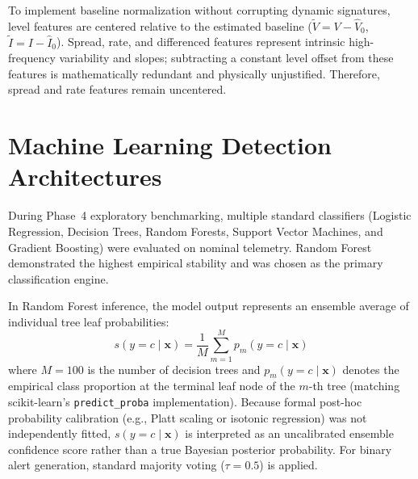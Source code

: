 \documentclass[conference]{IEEEtran}
\begin{document}
To implement baseline normalization without corrupting dynamic signatures, level features are centered relative to the estimated baseline ($\tilde{V} = V - \hat{V}_0$, $\tilde{I} = I - \hat{I}_0$). Spread, rate, and differenced features represent intrinsic high-frequency variability and slopes; subtracting a constant level offset from these features is mathematically redundant and physically unjustified. Therefore, spread and rate features remain uncentered.

\section{Machine Learning Detection Architectures}
During Phase~4 exploratory benchmarking, multiple standard classifiers (Logistic Regression, Decision Trees, Random Forests, Support Vector Machines, and Gradient Boosting) were evaluated on nominal telemetry. Random Forest demonstrated the highest empirical stability and was chosen as the primary classification engine.

In Random Forest inference, the model output represents an ensemble average of individual tree leaf probabilities:
\begin{equation}
s(y=c \mid \mathbf{x}) = \frac{1}{M} \sum_{m=1}^M p_m(y=c \mid \mathbf{x})
\label{eq:rf_score}
\end{equation}
where $M=100$ is the number of decision trees and $p_m(y=c \mid \mathbf{x})$ denotes the empirical class proportion at the terminal leaf node of the $m$-th tree (matching scikit-learn's \texttt{predict\_proba} implementation). Because formal post-hoc probability calibration (e.g., Platt scaling or isotonic regression) was not independently fitted, $s(y=c \mid \mathbf{x})$ is interpreted as an uncalibrated ensemble confidence score rather than a true Bayesian posterior probability. For binary alert generation, standard majority voting ($\tau = 0.5$) is applied.
\end{document}
